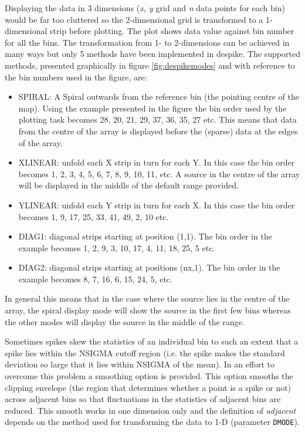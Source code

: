 \documentclass[twoside,11pt]{article}
\newcommand{\task}[1]{{\sf #1}}
\newcommand{\param}[1]{{\tt #1}}
\newcommand{\despike}{\htmlref{\task{despike}}{DESPIKE}}
\newcommand{\htmlref}[2]{#1}
\renewcommand{\_}{\texttt{\symbol{95}}}
\begin{document}
Displaying the data in 3 dimensions (\textit{x, y} grid and \textit{n} data points
for each bin) would be far too cluttered so the 2-dimensional grid is
transformed to a 1-dimensional strip before plotting. The plot shows data
value against bin  number for all the bins. The transformation from 1- to
2-dimensions can be achieved in many ways but only 5 methods have been
implemented in \despike.  The supported methods, presented graphically in
figure \ref{fig:despikemodes} and with reference to the bin numbers used in
the figure, are:


\begin{itemize} 

\item SPIRAL: A Spiral
outwards from the reference bin (the pointing centre of the map). Using the example presented in the figure
the bin order used by the plotting task becomes 28, 20, 21, 29, 37, 36, 35,
27 etc. This means that data from the centre of the array is displayed before
the (sparse) data at the edges of the array.

        \item XLINEAR: unfold each X strip in turn for each Y. In this case
the bin order becomes 1, 2, 3, 4, 5, 6, 7, 8, 9, 10, 11, etc. A source in
the centre of the array will be displayed in the middle of the default range
provided. 

        \item YLINEAR:  unfold each Y strip in turn for each X. In this case
the bin order becomes 1, 9, 17, 25, 33, 41, 49, 2, 10 etc.    

        \item DIAG1:    diagonal strips starting at position (1,1). The bin
order in the example becomes 1, 2, 9, 3, 10, 17, 4, 11, 18, 25, 5 etc.

        \item DIAG2:   diagonal strips starting at positions (nx,1). The bin 
order in the example becomes 8, 7, 16, 6, 15, 24, 5, etc.
        
\end{itemize}

In general this means that in the case where the source lies in the centre of
the array, the spiral display mode will show the source in the first
few bins whereas the other modes will display the source in the middle of
the range.

Sometimes spikes skew the statistics of an individual bin to such an extent
that a spike lies within the NSIGMA cutoff region (i.e. the spike makes the
standard deviation so large that it lies within NSIGMA of the mean). In an
effort to overcome this problem a smoothing option is provided. 
This option smooths the clipping envelope (the region that determines whether
a point is a spike or not) across adjacent bins so that fluctuations in the
statistics of adjacent bins are reduced. This smooth works in one dimension
only and the definition of \textit{adjacent} depends on the method used for
transforming the data to 1-D (parameter \param{DMODE}).
\end{document}
